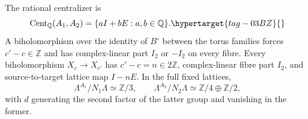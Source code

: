 \begin{proposition}\hypertarget{tag-01Q1}{}\label{fam:src:A.2.1}\label{fam:st:A.2.1}\hypertarget{tag-03CQ}{}\label{wb:pshift:lem:centralizer}

The rational centralizer is
\begin{equation}
 \operatorname{Cent}_{\mathbb Q}(A_1,A_2)
       =\{aI+bE:a,b\in\mathbb Q\}.
 \hypertarget{tag-03BZ}{}\label{wb:pshift:eq:centralizer}
\end{equation}
A biholomorphism over the identity of $B^\circ$ between the torus
families forces $c'-c\in\mathbb Z$ and has complex-linear part
$I_2$ or $-I_2$ on every fibre. Every biholomorphism $X_c\to X_{c'}$ has $c'-c=n\in2\mathbb Z$, complex-linear fibre part $I_2$, and source-to-target lattice map $I-nE$. In the full fixed lattices,
\[
 \Lambda^{A_1}/N_1\Lambda\simeq\mathbb Z/3,\qquad
 \Lambda^{A_2}/N_2\Lambda\simeq\mathbb Z/4\oplus\mathbb Z/2,
\]
with $d$ generating the second factor of the latter group and vanishing in the former.
\end{proposition}
